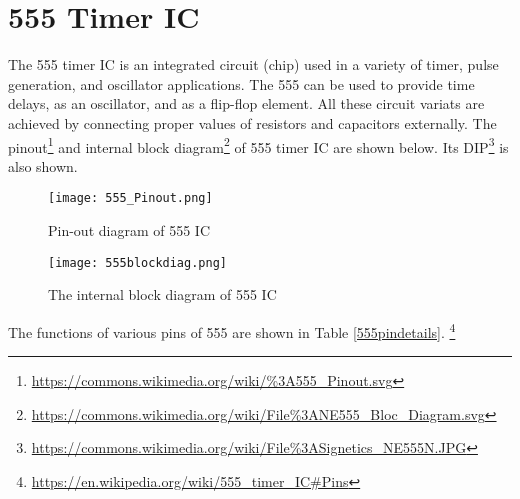 \section{555 Timer IC}
\label{555}

The 555 timer IC is an integrated circuit (chip) used in a variety of timer, pulse generation, and oscillator applications. The 555 can be used to provide time delays, as an oscillator, and as a flip-flop element. All these circuit variats are achieved by connecting proper values of resistors and capacitors externally.
The pinout\footnote{\url{https://commons.wikimedia.org/wiki/\%3A555_Pinout.svg}} and internal block diagram\footnote{\url{https://commons.wikimedia.org/wiki/File\%3ANE555_Bloc_Diagram.svg}} of 555 timer IC are shown below.
Its DIP\footnote{\url{https://commons.wikimedia.org/wiki/File\%3ASignetics_NE555N.JPG}} is also shown.
\begin{figure}[h]
\texttt{[image: 555\_Pinout.png]}
\caption{Pin-out diagram of 555 IC}
\end{figure}


\begin{figure}[h]


\texttt{[image: 555blockdiag.png]}
\caption{The internal block diagram of 555 IC}

\end{figure}

The functions of various pins of 555 are shown in Table \ref{555pindetails}. \footnote{\url{https://en.wikipedia.org/wiki/555_timer_IC\#Pins}}

